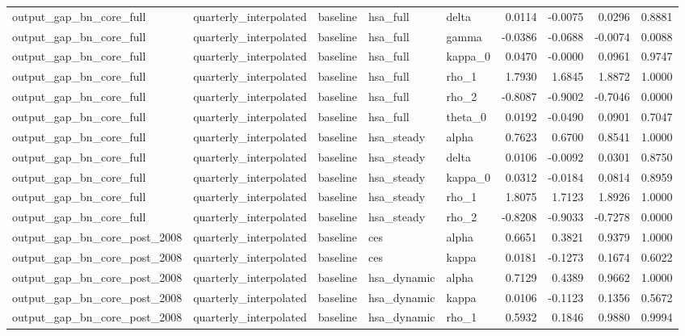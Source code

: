 \begin{tabular}{lllllrrrr}
output\_gap\_bn\_core\_full & quarterly\_interpolated & baseline & hsa\_full & delta & 0.0114 & -0.0075 & 0.0296 & 0.8881 \\
output\_gap\_bn\_core\_full & quarterly\_interpolated & baseline & hsa\_full & gamma & -0.0386 & -0.0688 & -0.0074 & 0.0088 \\
output\_gap\_bn\_core\_full & quarterly\_interpolated & baseline & hsa\_full & kappa\_0 & 0.0470 & -0.0000 & 0.0961 & 0.9747 \\
output\_gap\_bn\_core\_full & quarterly\_interpolated & baseline & hsa\_full & rho\_1 & 1.7930 & 1.6845 & 1.8872 & 1.0000 \\
output\_gap\_bn\_core\_full & quarterly\_interpolated & baseline & hsa\_full & rho\_2 & -0.8087 & -0.9002 & -0.7046 & 0.0000 \\
output\_gap\_bn\_core\_full & quarterly\_interpolated & baseline & hsa\_full & theta\_0 & 0.0192 & -0.0490 & 0.0901 & 0.7047 \\
output\_gap\_bn\_core\_full & quarterly\_interpolated & baseline & hsa\_steady & alpha & 0.7623 & 0.6700 & 0.8541 & 1.0000 \\
output\_gap\_bn\_core\_full & quarterly\_interpolated & baseline & hsa\_steady & delta & 0.0106 & -0.0092 & 0.0301 & 0.8750 \\
output\_gap\_bn\_core\_full & quarterly\_interpolated & baseline & hsa\_steady & kappa\_0 & 0.0312 & -0.0184 & 0.0814 & 0.8959 \\
output\_gap\_bn\_core\_full & quarterly\_interpolated & baseline & hsa\_steady & rho\_1 & 1.8075 & 1.7123 & 1.8926 & 1.0000 \\
output\_gap\_bn\_core\_full & quarterly\_interpolated & baseline & hsa\_steady & rho\_2 & -0.8208 & -0.9033 & -0.7278 & 0.0000 \\
output\_gap\_bn\_core\_post\_2008 & quarterly\_interpolated & baseline & ces & alpha & 0.6651 & 0.3821 & 0.9379 & 1.0000 \\
output\_gap\_bn\_core\_post\_2008 & quarterly\_interpolated & baseline & ces & kappa & 0.0181 & -0.1273 & 0.1674 & 0.6022 \\
output\_gap\_bn\_core\_post\_2008 & quarterly\_interpolated & baseline & hsa\_dynamic & alpha & 0.7129 & 0.4389 & 0.9662 & 1.0000 \\
output\_gap\_bn\_core\_post\_2008 & quarterly\_interpolated & baseline & hsa\_dynamic & kappa & 0.0106 & -0.1123 & 0.1356 & 0.5672 \\
output\_gap\_bn\_core\_post\_2008 & quarterly\_interpolated & baseline & hsa\_dynamic & rho\_1 & 0.5932 & 0.1846 & 0.9880 & 0.9994 \\

\end{tabular}

